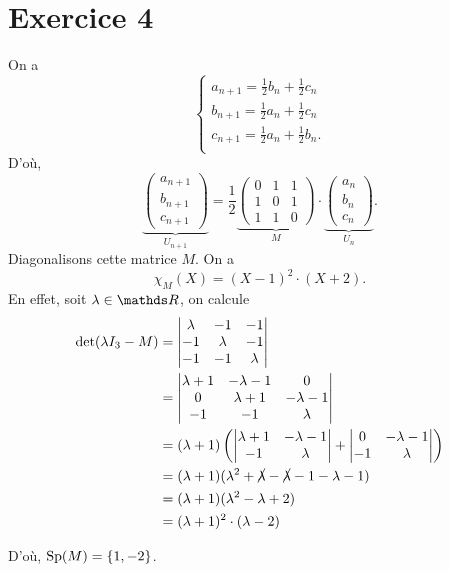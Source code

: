 \section{Exercice 4}

On a \[
	\begin{cases}
		a_{n+1} = \frac{1}{2} b_n + \frac{1}{2} c_n\\
		b_{n+1} = \frac{1}{2} a_n + \frac{1}{2} c_n\\
		c_{n+1} = \frac{1}{2} a_n + \frac{1}{2} b_n.\\
	\end{cases}
\]
D'où, \[
	\underbrace{\begin{pmatrix}
		a_{n+1}\\b_{n+1}\\c_{n+1}
	\end{pmatrix}}_{U_{n+1}} = \frac{1}{2} \underbrace{\begin{pmatrix}
		0&1&1\\
		1&0&1\\
		1&1&0
	\end{pmatrix}}_M \cdot \underbrace{\begin{pmatrix}
		a_{n}\\b_{n}\\c_{n}
	\end{pmatrix}}_{U_n}
.\]
Diagonalisons cette matrice $M$.
On a \[
	\chi_M(X) = (X - 1)^2 \cdot (X + 2)
.\]
En effet, soit $\lambda \in \R$, on calcule
\begin{align*}
	\det(\lambda I_3 - M) &=
	\begin{vmatrix}
		\lambda & -1 & -1\\
		-1 & \lambda & -1\\
		-1 & -1 & \lambda
	\end{vmatrix}\\
	&= 
	\begin{vmatrix}
		\lambda + 1 & -\lambda - 1 & 0\\
		0 & \lambda + 1 & -\lambda- 1\\
		-1 & -1 & \lambda
	\end{vmatrix}\\
	&= (\lambda + 1) \left( 
	\begin{vmatrix}
		\lambda + 1 & -\lambda - 1\\
		-1 & \lambda
	\end{vmatrix} + 
	\begin{vmatrix}
		0 & -\lambda - 1\\
		-1 & \lambda
	\end{vmatrix}\right) \\
	&= (\lambda + 1)(\lambda^2 + \cancel\lambda - \cancel\lambda - 1 - \lambda - 1)\\
	&= (\lambda + 1)(\lambda^2 - \lambda + 2) \\
	&= (\lambda + 1)^2\cdot (\lambda - 2) \\
\end{align*}

D'où, $\Sp(M) = \{1,-2\}$.


